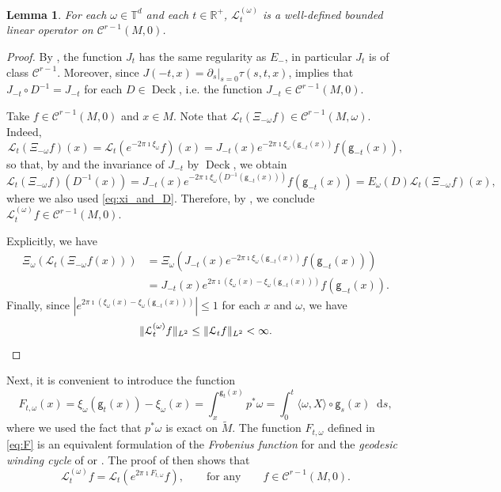\documentclass[11pt,letterpaper]{amsart}
\newcommand \cL {{\mathcal L}}
\newcommand \R {{ \mathbb R}}
\newcommand \T {{ \mathbb T}}
\newcommand \tM {{\widetilde M}}
\newcommand \cC {{\mathscr{C}}}
\newcommand{\geo}{\mathsf{g}}
\newcommand*{\diff}{\mathop{}\!\mathrm{d}}
\DeclareMathOperator{\Deck}{Deck}
\newtheorem {lemma}[theorem]{Lemma}
\theoremstyle{definition}
\begin{document}
\begin{lemma}\label{lem:invar}
For each $\omega \in \T^d$ and each $t \in \R^+$, $\cL_{t}^{(\omega)}$ is a well-defined bounded linear operator on $\cC^{r-1}(M,0)$.
\end{lemma}
\begin{proof}
By , the function $J_t$ has the same regularity as $E_{-}$, in particular $J_t$ is of class $\mathscr{C}^{r-1}$. 
Moreover, since $J(-t,x)=\partial_s |_{s=0}\tau(s,t,x)$,  implies that $J_{-t}\circ D^{-1}=J_{-t}$ for each $D\in \Deck$, i.e. the function $J_{-t} \in \cC^{r-1}(M,0)$.

Take $f \in \cC^{r-1}(M,0)$ and $x\in M$. Note that $\cL_t (\Xi_{-\omega}f) \in \cC^{r-1}(M, \omega)$. Indeed,
\[
\cL_t (\Xi_{-\omega}f)(x)= \cL_t (e^{-2\pi\imath \xi_\omega}f)(x)=J_{-t}(x) e^{-2\pi\imath \xi_\omega(\geo_{-t}(x))}f(\geo_{-t}(x)),
\]
so that, by  and the invariance of $J_{-t}$ by $\Deck$, we obtain
\[
\cL_t (\Xi_{-\omega}f)(D^{-1}(x)) = J_{-t}(x) e^{-2\pi\imath \xi_\omega(D^{-1}(\geo_{-t}(x)))}f(\geo_{-t}(x)) = E_\omega(D) \cL_t (\Xi_{-\omega}f)(x),
\]
where we also used \eqref{eq:xi_and_D}. 
Therefore, by , we conclude $\cL^{(\omega)}_tf \in \cC^{r-1}(M,0)$.  

Explicitly, we have
\[
\begin{split}
\Xi_{\omega}( \cL_t (\Xi_{-\omega}f(x)))&=\Xi_{\omega}( J_{-t}(x)e^{-2\pi\imath \xi_\omega(\geo_{-t}(x)) }f(\geo_{-t}(x)))\\
&= J_{-t}(x)e^{2\pi \imath (\xi_\omega(x) - \xi_\omega(\geo_{-t}(x)) )}f(\geo_{-t}(x)).
\end{split}
\]
Finally, since $|e^{2\pi \imath (\xi_\omega(x)-\xi_\omega(\geo_{-t}(x)))}|\le 1$ for each $x$ and $\omega$, we have 
\[
\|\cL^{(\omega)}_tf\|_{L^2}\le \|\cL_t f\|_{L^2}<\infty. \qedhere
\]
\end{proof}

Next, it is convenient to introduce the function 
\begin{equation}\label{eq:F}
F_{t,\omega}(x)= \xi_\omega(\geo_{t}(x))- \xi_\omega(x) = \int_x^{\geo_{t}(x)} p^{\ast}\omega = \int_0^t \langle \omega, X \rangle\circ \geo_{s}(x) \diff s,
\end{equation}
where we used the fact that $p^\ast \omega$ is exact on $\tM$.
The function $F_{t,\omega}$ defined in \eqref{eq:F} is an equivalent formulation of the {\it Frobenius function} for \cite{AvDoDu} and the {\it geodesic winding cycle} of \cite{KatSun} or \cite{GuLe}.
The proof of  then shows that
\begin{equation}\label{eq:twisted}
\cL^{(\omega)}_t f= \cL_t(e^{2\pi \imath F_{t,\omega}}f), \qquad \text{for any} \qquad f\in \cC^{r-1}(M,0).
\end{equation}
\end{document}
